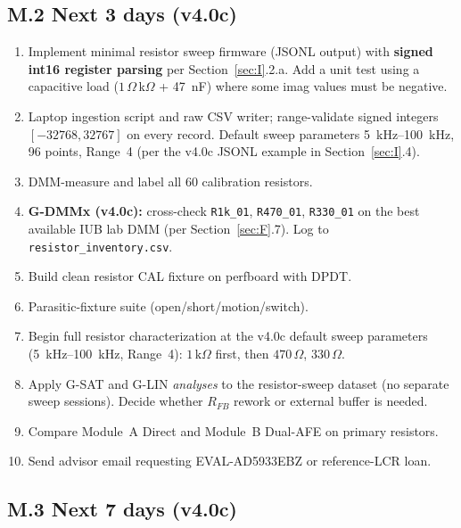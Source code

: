\documentclass[11pt,a4paper]{article}
\newcommand{\kohm}[1]{\ensuremath{#1\,\mathrm{k}\Omega}}
\newcommand{\Rohm}[1]{\ensuremath{#1\,\Omega}}
\begin{document}
\subsection{M.2 Next 3 days (v4.0c)}

\begin{enumerate}
\item Implement minimal resistor sweep firmware (JSONL output) with \textbf{signed int16 register parsing} per Section~\ref{sec:I}.2.a. Add a unit test using a capacitive load (\Rohm{1}\,k$\Omega$ + \SI{47}{\nano\farad}) where some imag values must be negative.
\item Laptop ingestion script and raw CSV writer; range-validate signed integers $[-32768, 32767]$ on every record. Default sweep parameters \SIrange{5}{100}{\kilo\hertz}, 96 points, Range~4 (per the v4.0c JSONL example in Section~\ref{sec:I}.4).
\item DMM-measure and label all 60 calibration resistors.
\item \textbf{G-DMMx (v4.0c):} cross-check \texttt{R1k\_01}, \texttt{R470\_01}, \texttt{R330\_01} on the best available IUB lab DMM (per Section~\ref{sec:F}.7). Log to \texttt{resistor\_inventory.csv}.
\item Build clean resistor CAL fixture on perfboard with DPDT.
\item Parasitic-fixture suite (open/short/motion/switch).
\item Begin full resistor characterization at the v4.0c default sweep parameters (\SIrange{5}{100}{\kilo\hertz}, Range~4): \kohm{1} first, then \Rohm{470}, \Rohm{330}.
\item Apply G-SAT and G-LIN \emph{analyses} to the resistor-sweep dataset (no separate sweep sessions). Decide whether $R_{FB}$ rework or external buffer is needed.
\item Compare Module~A Direct and Module~B Dual-AFE on primary resistors.
\item Send advisor email requesting EVAL-AD5933EBZ or reference-LCR loan.
\end{enumerate}

\subsection{M.3 Next 7 days (v4.0c)}
\end{document}

